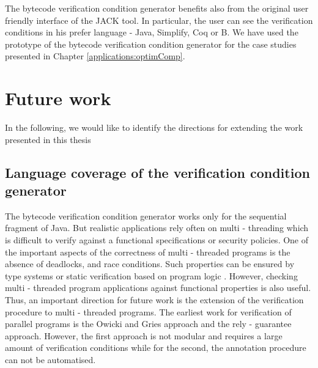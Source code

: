 The bytecode verification condition generator benefits also from the original user friendly interface of the JACK tool.  In particular, 
the user can see the verification conditions in his prefer language - Java, Simplify, Coq or B.
We have used the prototype of the bytecode verification condition generator for the case studies presented in Chapter \ref{applications:optimComp}.


\section{Future work}
In the following, we would like to identify the directions for extending the work presented in this thesis

\subsection{Language coverage of the verification condition generator}
The bytecode verification condition generator works only for the sequential fragment of Java. But realistic applications 
rely often on multi - threading which is difficult to verify against a functional specifications or security policies.
One of the important aspects of the correctness of multi - threaded programs is the absence of deadlocks, 
and race conditions. Such properties can be ensured  by type systems \cite{FA99TSL,flanagan00typebased} or static verification based on program logic \cite{FLL02ESC}.  
  However, checking multi - threaded
 program applications against functional properties is also  useful. 
 Thus, an important direction for future work is the extension of the verification procedure to multi - threaded programs.
The earliest work for  verification of  parallel programs is  the Owicki and Gries approach   
\cite{nipkow99owickigries}  and the rely - guarantee approach. However, 
the first approach is not modular and requires a large amount of verification conditions while for the second, the annotation procedure can not be automatised.

